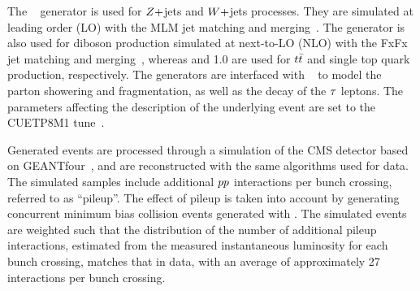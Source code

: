 The \aMCATNLO~\cite{Alwall:2014hca} generator is used for $Z+$jets and $W+$jets processes. They are simulated at leading order (LO) with the MLM jet matching and merging~\cite{Alwall:2007fs}.
The \aMCATNLO generator is also used for diboson production simulated at next-to-LO (NLO) with the FxFx jet matching and merging~\cite{Frederix:2012ps}, whereas  and 1.0 are used for $t\bar{t}$ and single top quark production, respectively.
The generators are interfaced with  ~\cite{Sjostrand:2014zea} to model the parton showering and fragmentation, as well as the decay of the $\tau$ leptons.
The \PYTHIA parameters affecting the description of the underlying event are set to the {CUETP8M1} tune~\cite{Khachatryan:2015pea}.

Generated events are processed through a simulation of the CMS detector based on
GEANTfour~\cite{Agostinelli:2002hh}, and are reconstructed with the same algorithms used for data.
The simulated samples include additional $pp$ interactions per bunch
crossing, referred to as ``pileup''.
The effect of pileup is taken into account by generating concurrent minimum bias collision events generated with \PYTHIA.
The simulated events are weighted such that the distribution of the number of additional pileup interactions, estimated from the measured instantaneous luminosity for each bunch crossing, matches that in data, with an average of approximately 27 interactions per bunch crossing.

